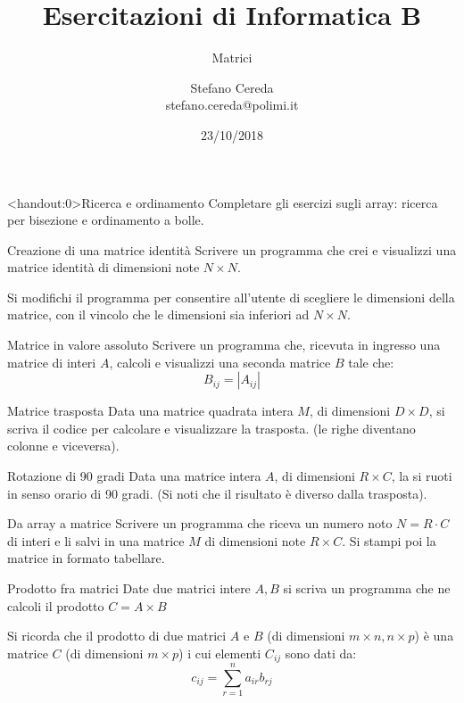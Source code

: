 \documentclass[format=169]{beamer}
\title{Esercitazioni di Informatica B}
\subtitle{Matrici}
\author{Stefano Cereda\\
	stefano.cereda@polimi.it
}
\date{23/10/2018}
\institute[PoliMi]{\vspace{0.5cm}\centering Politecnico di Milano \\ \vspace{0.2cm}
	\texttt{[image: ../logopolimi]}}
\begin{document}
	\begin{frame}
	\maketitle
	\end{frame}

\begin{frame}<handout:0>{Ricerca e ordinamento}
Completare gli esercizi sugli array: ricerca per bisezione e ordinamento a bolle.
\end{frame}

\begin{frame}{Creazione di una matrice identità}
Scrivere un programma che crei e visualizzi una matrice identità di dimensioni note $N \times N$.

Si modifichi il programma per consentire all'utente di scegliere le dimensioni della matrice, con il vincolo che le dimensioni sia inferiori ad $N \times N$.
\end{frame}

\begin{frame}{Matrice in valore assoluto}
Scrivere un programma che, ricevuta in ingresso una matrice di interi $A$, calcoli e visualizzi una seconda matrice $B$ tale che:
\[ B_{ij} = |A_{ij}| \]
\end{frame}

\begin{frame}{Matrice trasposta}
Data una matrice quadrata intera $M$, di dimensioni $D \times D$, si scriva il codice per calcolare e visualizzare la trasposta. (le righe diventano colonne e viceversa).
\end{frame}

\begin{frame}{Rotazione di 90 gradi}
Data una matrice intera $A$, di dimensioni $R \times C$, la si ruoti in senso orario di 90 gradi. (Si noti che il risultato è diverso dalla trasposta).
\end{frame}

\begin{frame}{Da array a matrice}
Scrivere un programma che riceva un numero noto $N=R\cdot C$ di interi e li salvi in una matrice $M$ di dimensioni note $R \times C$. Si stampi poi la matrice in formato tabellare.
\end{frame}


\begin{frame}{Prodotto fra matrici}
Date due matrici intere $A, B$ si scriva un programma che ne calcoli il prodotto $C=A\times B$

Si ricorda che il prodotto di due matrici $A$ e $B$ (di dimensioni $m \times n, n \times p$) è una matrice $C$ (di dimensioni $m \times p$) i cui elementi $C_{ij}$ sono dati da:
\[ c_{ij} = \sum_{r=1}^n  a_{ir}b_{rj} \]
\end{frame} 
\end{document}
